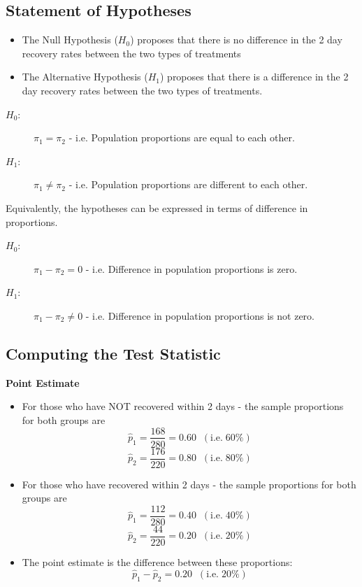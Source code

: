 \documentclass[a4paper,12pt]{article}
\begin{document}
\subsection*{Statement of Hypotheses}


\begin{itemize}
\item The Null Hypothesis ($H_0$) proposes that there is no difference in the 2 day recovery rates between the two types of treatments
\item The Alternative Hypothesis ($H_1$) proposes that there is a difference in the 2 day recovery rates between the two types of treatments.
\end{itemize}
\begin{description}
\item[$H_0$:] $\pi_1 = \pi_2$  - i.e. Population proportions are equal to each other.
\item[$H_1$:] $\pi_1 \neq \pi_2$ - i.e. Population proportions are different to each other.
\end{description}

\noindent Equivalently, the hypotheses can be expressed in terms of difference in proportions.
\begin{description}
\item[$H_0$:] $\pi_1 - \pi_2 = 0$ - i.e. Difference in population proportions is zero.
\item[$H_1$:] $\pi_1 - \pi_2 \neq 0$ - i.e. Difference in population proportions is not zero.
\end{description}

\newpage
\subsection*{Computing the Test Statistic}

\noindent \textbf{Point Estimate}

\begin{itemize}
 \item For those who have NOT recovered within 2 days - the sample proportions for both groups are
\[ \hat{p}_1 = \frac{168}{280} = 0.60 \;\;(\mbox{i.e.}\; 60\%) \] 
\[ \hat{p}_2 = \frac{176}{220} = 0.80 \;\;(\mbox{i.e.}\; 80\%) \]  
\item For those who have recovered within 2 days - the sample proportions for both groups are
\[ \hat{p}_1 = \frac{112}{280} = 0.40 \;\;(\mbox{i.e.}\; 40\%) \] 
\[ \hat{p}_2 = \frac{44}{220} = 0.20 \;\;(\mbox{i.e.}\; 20\%) \]  
\item The point estimate is the difference between these proportions:
\[ \hat{p}_1  - \hat{p}_2  = 0.20 \;\;(\mbox{i.e.}\; 20\%) \]
\end{itemize}
\end{document}
